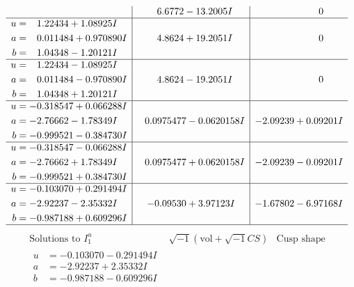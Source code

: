 \documentclass[1p]{elsarticle_modified}
\theoremstyle{definition}
\newcommand{\I}{\sqrt{-1}}
\begin{document}
$$\begin{array}{c|c|c}
 & \phantom{-}6.6772 - 13.2005 I & \phantom{-0.000000 } 0 \\ \hline\begin{aligned}
u &= \phantom{-}1.22434 + 1.08925 I \\
a &= \phantom{-}0.011484 + 0.970890 I \\
b &= \phantom{-}1.04348 - 1.20121 I\end{aligned}
 & \phantom{-}4.8624 + 19.2051 I & \phantom{-0.000000 } 0 \\ \hline\begin{aligned}
u &= \phantom{-}1.22434 - 1.08925 I \\
a &= \phantom{-}0.011484 - 0.970890 I \\
b &= \phantom{-}1.04348 + 1.20121 I\end{aligned}
 & \phantom{-}4.8624 - 19.2051 I & \phantom{-0.000000 } 0 \\ \hline\begin{aligned}
u &= -0.318547 + 0.066288 I \\
a &= -2.76662 - 1.78349 I \\
b &= -0.999521 - 0.384730 I\end{aligned}
 & \phantom{-}0.0975477 - 0.0620158 I & -2.09239 + 0.09201 I \\ \hline\begin{aligned}
u &= -0.318547 - 0.066288 I \\
a &= -2.76662 + 1.78349 I \\
b &= -0.999521 + 0.384730 I\end{aligned}
 & \phantom{-}0.0975477 + 0.0620158 I & -2.09239 - 0.09201 I \\ \hline\begin{aligned}
u &= -0.103070 + 0.291494 I \\
a &= -2.92237 - 2.35332 I \\
b &= -0.987188 + 0.609296 I\end{aligned}
 & -0.09530 + 3.97123 I & -1.67802 - 6.97168 I\\
 \hline 
 \end{array}$$\newpage$$\begin{array}{c|c|c}  
\text{Solutions to }I^u_{1}& \I (\text{vol} + \sqrt{-1}CS) & \text{Cusp shape}\\
 \hline 
\begin{aligned}
u &= -0.103070 - 0.291494 I \\
a &= -2.92237 + 2.35332 I \\
b &= -0.987188 - 0.609296 I\end{aligned}

\end{array}$$
\end{document}
